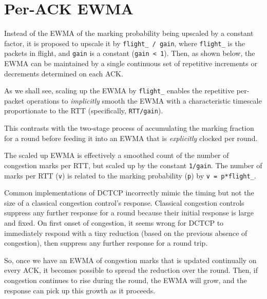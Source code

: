 \section{Per-ACK EWMA}\label{prresp_Per-Packet_EWMA}

Instead of the EWMA of the marking probability being upscaled by a constant factor, it is proposed to upscale it by \texttt{flight\_ / gain}, where \texttt{flight\_} is the packets in flight, and \texttt{gain} is a constant (\texttt{gain < 1}). Then, as shown below, the EWMA can be maintained by a single continuous set of repetitive increments or decrements determined on each ACK.

As we shall see, scaling up the EWMA by \texttt{flight\_} enables the repetitive per-packet operations to \emph{implicitly} smooth the EWMA with a characteristic timescale proportionate to the RTT (specifically, \texttt{RTT/gain}).

This contrasts with the two-stage process of accumulating the marking fraction for a round before feeding it into an EWMA that is \emph{explicitly} clocked per round.

The scaled up EWMA is effectively a smoothed count of the number of congestion marks per RTT, but scaled up by the constant \texttt{1/gain}. The number of marks per RTT (\texttt{v}) is related to the marking probability (\texttt{p}) by \texttt{v = p*flight\_}.

Common implementations of DCTCP incorrectly mimic the timing but not the size of a classical congestion control's response. Classical congestion controls suppress any further response for a round because their initial response is large and fixed. On first onset of congestion, it seems wrong for DCTCP to immediately respond with a tiny reduction (based on the previous absence of congestion), then suppress any further response for a round trip. 

So, once we have an EWMA of congestion marks that is updated continually on every ACK, it becomes possible to spread the reduction over the round. Then,  if congestion continues to rise during the round, the EWMA will grow, and the response can pick up this growth as it proceeds.

